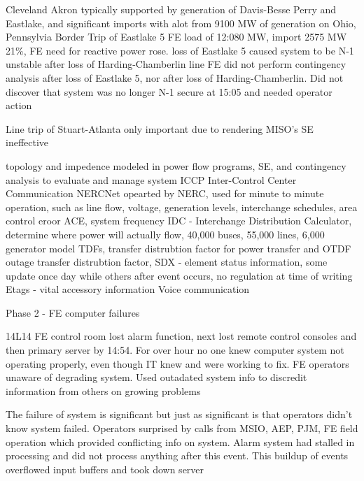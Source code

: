 Cleveland Akron typically supported by generation of Davis-Besse Perry and Eastlake, and significant imports with alot from 9100 MW of generation on Ohio, Pennsylvia Border
Trip of Eastlake 5
FE load of 12:080 MW, import 2575 MW 21\%, FE need for reactive power rose.
loss of Eastlake 5 caused system to be N-1 unstable after loss of Harding-Chamberlin line
FE did not perform contingency analysis after loss of Eastlake 5, nor after loss of Harding-Chamberlin.  Did not discover that system was no longer N-1 secure at 15:05 and needed operator action

Line trip of Stuart-Atlanta only important due to rendering MISO's SE ineffective

topology and impedence modeled in power flow programs, SE, and contingency analysis to evaluate and manage system
ICCP Inter-Control Center Communication NERCNet opearted by NERC, used for minute to minute operation, such as line flow, voltage, generation levels, interchange schedules, area control eroor ACE, system frequency
IDC - Interchange Distribution Calculator, determine where power will actually flow, 40,000 buses, 55,000 lines, 6,000 generator model TDFs, transfer distrubtion factor for power transfer and OTDF outage transfer distrubtion factor, 
SDX - element status information, some update once day while others after event occurs, no regulation at time of writing
Etags - vital accessory information
Voice communication


Phase 2 - FE computer failures

14L14 FE control room lost alarm function, next lost remote control consoles and then primary server by 14:54.  For over hour no one knew computer system not operating properly, even though IT knew and were working to fix.  FE operators unaware of degrading system.  Used outadated system info to discredit information from others on growing problems

The failure of system is significant but just as significant is that operators didn't know system failed.  Operators surprised by calls from MSIO, AEP, PJM, FE field operation which provided conflicting info on system.  Alarm system had stalled in processing and did not process anything after this event.  This buildup of events overflowed input buffers and took down server

